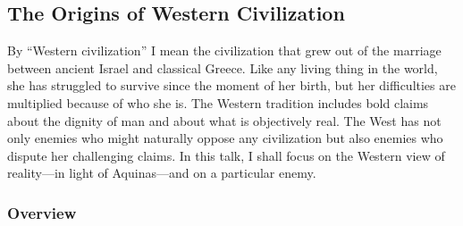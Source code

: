 \documentclass[twocolumn]{article}
\begin{document}
\subsection{The Origins of Western Civilization}

By ``Western civilization'' I mean the civilization that grew out of the
marriage between ancient Israel and classical Greece.  Like any living thing in
the world, she has struggled to survive since the moment of her birth, but her
difficulties are multiplied because of who she is.  The Western tradition
includes bold claims about the dignity of man and about what is objectively
real.  The West has not only enemies who might naturally oppose any
civilization but also enemies who dispute her challenging claims.  In this
talk, I shall focus on the Western view of reality---in light of Aquinas---and
on a particular enemy.

\subsubsection{Overview}
\end{document}
